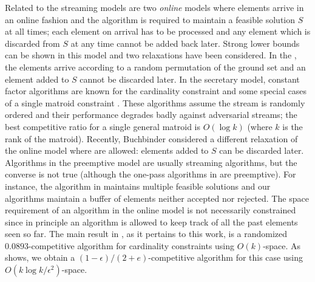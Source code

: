 \documentclass[oneside,letterpaper]{scrartcl} \usepackage{macros}
\newcommand{\eps}{\epsilon}
\begin{document}
Related to the streaming models are two {\em online} models where
elements arrive in an online fashion and the algorithm is required to
maintain a feasible solution $S$ at all times; each element on arrival
has to be processed and any element which is discarded from $S$ at any
time cannot be added back later. Strong lower bounds can be shown in
this model and two relaxations have been considered.  In the
, the elements arrive according to a random
permutation of the ground set and an element added to $S$ cannot be
discarded later. In the secretary model, constant factor algorithms
are known for the cardinality constraint and some special cases of a
single matroid constraint \cite{grst-10,bhz-13}.  These algorithms
assume the stream is randomly ordered and their performance degrades
badly against adversarial streams; the best competitive ratio for a
single general matroid is $O(\log k)$ (where $k$ is the rank of the
matroid).  Recently, Buchbinder \etal \cite{bfs-osmp-15} considered a
different relaxation of the online model where 
are allowed: elements added to $S$ can be discarded later. Algorithms
in the preemptive model are usually streaming algorithms, but the
converse is not true (although the one-pass algorithms in
\cite{ck-smms-14} are preemptive). For instance, the algorithm in
\cite{bmkk-sso-14} maintains multiple feasible solutions and our
algorithms maintain a buffer of elements neither accepted nor
rejected. The space requirement of an algorithm in the online model is
not necessarily constrained since in principle an algorithm is allowed
to keep track of all the past elements seen so far. The main result in
\cite{bfs-osmp-15}, as it pertains to this work, is a randomized
$0.0893$-competitive algorithm for cardinality constraints using
$O(k)$-space. As  shows, we obtain a
$(1-\eps)/(2+e)$-competitive algorithm for this case using $O(k \log
k/\eps^2)$-space.
\end{document}
